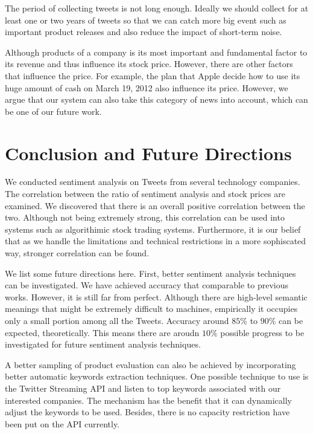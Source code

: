 \documentclass[12pt]{article}
\begin{document}
The period of collecting tweets is not long enough. Ideally we should collect for at least one or two years of tweets so that we can catch more big event such as important product releases and also reduce the impact of short-term noise.

Although products of a company is its most important and fundamental factor to its revenue and thus influence its stock price. However, there are other factors that influence the price. For example, the plan that Apple decide how to use its huge amount of cash on March 19, 2012 also influence its price. However, we argue that our system can also take this category of news into account, which can be one of our future work.

\section{Conclusion and Future Directions}

We conducted sentiment analysis on Tweets from several technology companies. The correlation between the ratio of sentiment analysis and stock prices are examined. We discovered that there is an overall positive correlation between the two. Although not being extremely strong, this correlation can be used into systems such as algorithimic stock trading systems. Furthermore, it is our belief that as we handle the limitations and technical restrictions in a more sophiscated way, stronger correlation can be found.

We list some future directions here. First, better sentiment analysis techniques can be investigated. We have achieved accuracy that comparable to previous works. However, it is still far from perfect. Although there are high-level semantic meanings that might be extremely difficult to machines, empirically it occupies only a small portion among all the Tweets. Accuracy around $85\%$ to $90\%$ can be expected, theoretically. This means there are aroudn $10\%$ possible progress to be investigated for future sentiment analysis techniques.

A better sampling of product evaluation can also be achieved by incorporating better automatic keywords extraction techniques. One possible technique to use is the Twitter Streaming API \cite{TwtStrAPI} and listen to top keywords associated with our interested companies. The mechanism has the benefit that it can dynamically adjust the keywords to be used. Besides, there is no capacity restriction have been put on the API currently.
\end{document}
